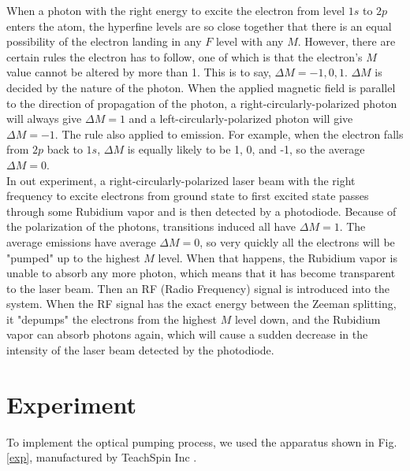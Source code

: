 \documentclass[prb,preprint]{revtex4-1}
\begin{document}
When a photon with the right energy to excite the electron from level $1s$ to $2p$ enters the atom, the hyperfine levels are so close together that there is an equal possibility of the electron landing in any $F$ level with any $M$. However, there are certain rules the electron has to follow, one of which is that the electron's $M$ value cannot be altered by more than 1. This is to say, $\Delta M=-1, 0, 1$. $\Delta M$ is decided by the nature of the photon. When the applied magnetic field is parallel to the direction of propagation of the photon, a right-circularly-polarized photon will always give $\Delta M=1$ and a left-circularly-polarized photon will give $\Delta M=-1$. The rule also applied to emission. For example, when the electron falls from $2p$ back to $1s$, $\Delta M$ is equally likely to be 1, 0, and -1, so the average $\Delta M=0$. \\

In out experiment, a right-circularly-polarized laser beam with the right frequency to excite electrons from ground state to first excited state passes through some Rubidium vapor and is then detected by a photodiode. Because of the polarization of the photons, transitions induced all have $\Delta M=1$. The average emissions have average $\Delta M=0$, so very quickly all the electrons will be "pumped" up to the highest $M$ level. When that happens, the Rubidium vapor is unable to absorb any more photon, which means that it has become transparent to the laser beam. Then an RF (Radio Frequency) signal is introduced into the system. When the RF signal has the exact energy between the Zeeman splitting, it "depumps" the electrons from the highest $M$ level down, and the Rubidium vapor can absorb photons again, which will cause a sudden decrease in the intensity of the laser beam detected by the photodiode. \\

\section{Experiment}

To implement the optical pumping process, we used the apparatus shown in Fig. 
\ref{exp}, manufactured by TeachSpin Inc \cite{teach}. \\
\end{document}
